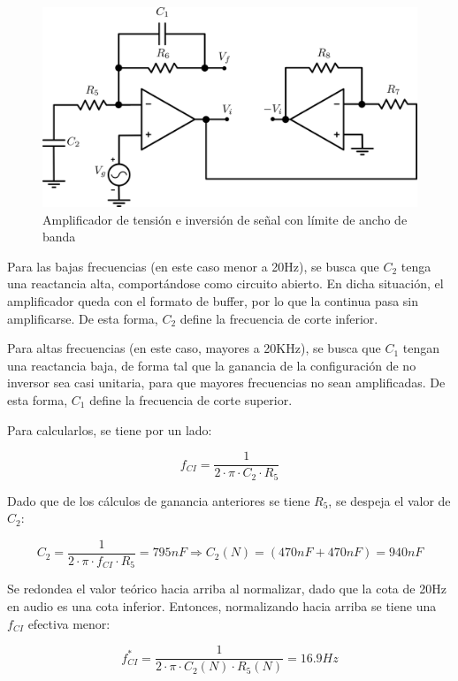 \begin{figure}[!ht]
\begin{centering}
\includegraphics[scale=0.5]{Imagenes/Opamp2ConCap.png}
\par\end{centering}
\caption{Amplificador de tensión e inversión de señal con límite de ancho de banda}
\end{figure}

Para las bajas frecuencias (en este caso menor a 20Hz), se busca que $C_2$ tenga una reactancia alta, comportándose como circuito abierto. En dicha situación, el amplificador queda con el formato de buffer, por lo que la continua pasa sin amplificarse. De esta forma, $C_2$ define la frecuencia de corte inferior.\par
Para altas frecuencias (en este caso, mayores a 20KHz), se busca que $C_1$ tengan una reactancia baja, de forma tal que la ganancia de la configuración de no inversor sea casi unitaria, para que mayores frecuencias no sean amplificadas. De esta forma, $C_1$ define la frecuencia de corte superior.\par
Para calcularlos, se tiene por un lado:

\[
f_{CI} = \frac{1}{2 \cdot \pi \cdot C_2 \cdot R_5}
\]
 
Dado que de los cálculos de ganancia anteriores se tiene $R_5$, se despeja el valor de $C_2$:

\[
C_2 = \frac{1}{2 \cdot \pi \cdot f_{CI} \cdot R_5} = 795nF \Longrightarrow C_2(N) = (470nF + 470nF) = 940nF
\]

Se redondea el valor teórico hacia arriba al normalizar, dado que la cota de 20Hz en audio es una cota inferior. Entonces, normalizando hacia arriba se tiene una $f_{CI}$ efectiva menor:

\[
f_{CI}^* = \frac{1}{2 \cdot \pi \cdot C_2(N) \cdot R_5(N)} = 16.9Hz
\]

